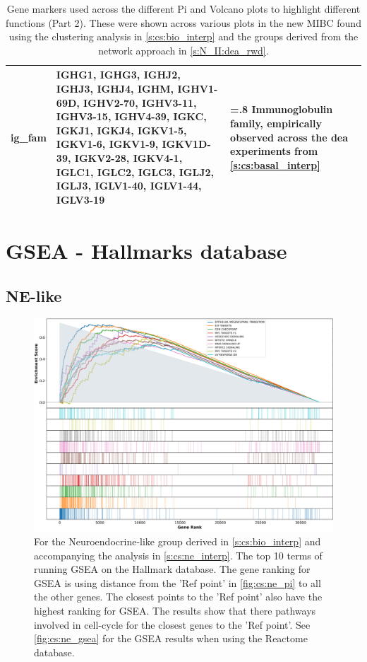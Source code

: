 \begin{table}[H]
\begin{tabularx}{\textwidth}{>{\hsize=0.6\hsize}X|>{\hsize=1.6\hsize}X|>{\hsize=.8\hsize}X}
        \midrule
        \textbf{ig\_fam} & IGHG1, IGHG3, IGHJ2, IGHJ3, IGHJ4, IGHM, IGHV1-69D, IGHV2-70, IGHV3-11, IGHV3-15, IGHV4-39, IGKC, IGKJ1, IGKJ4, IGKV1-5, IGKV1-6, IGKV1-9, IGKV1D-39, IGKV2-28, IGKV4-1, IGLC1, IGLC2, IGLC3, IGLJ2, IGLJ3, IGLV1-40, IGLV1-44, IGLV3-19 & Immunoglobulin family, empirically observed across the \acrlong{dea} experiments from \cref{s:cs:basal_interp} \\
        \bottomrule
    \end{tabularx}
    \caption{Gene markers used across the different Pi and Volcano plots to highlight different functions (Part 2). These were shown across various plots in the new MIBC found using the clustering analysis in \cref{s:cs:bio_interp} and the groups derived from the network approach in \cref{s:N_II:dea_rwd}.}
    \label{tab:ap:pi_genes_2}
\end{table}


\section{GSEA - Hallmarks database} \label{s:ap:cs:gsea_ne}

\subsection{NE-like}

\begin{figure}[H]    
    \centering
\includegraphics[width=1.0\textwidth,keepaspectratio]{Sections/ClusteringAnalysis/Resources/discussion/other_groups/ne2_hallmark_10_top.png}
     \caption{For the Neuroendocrine-like group derived in \cref{s:cs:bio_interp} and accompanying the analysis in \cref{s:cs:ne_interp}. The top 10 terms of running GSEA on the Hallmark database. The gene ranking for GSEA is using distance from the 'Ref point' in \cref{fig:cs:ne_pi} to all the other genes. The closest points to the 'Ref point' also have the highest ranking for GSEA. The results show that there pathways involved in cell-cycle for the closest genes to the 'Ref point'. See \cref{fig:cs:ne_gsea} for the GSEA results when using the Reactome database. }
    \label{fig:ap:cs:gsea_ne_hallmark}
\end{figure}


